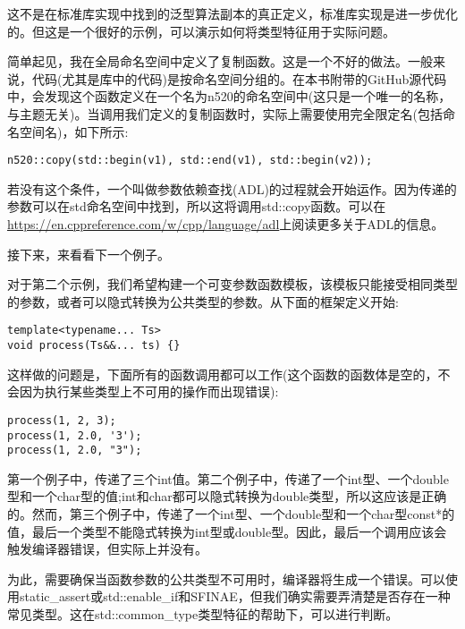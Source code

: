 这不是在标准库实现中找到的泛型算法副本的真正定义，标准库实现是进一步优化的。但这是一个很好的示例，可以演示如何将类型特征用于实际问题。

简单起见，我在全局命名空间中定义了复制函数。这是一个不好的做法。一般来说，代码(尤其是库中的代码)是按命名空间分组的。在本书附带的GitHub源代码中，会发现这个函数定义在一个名为n520的命名空间中(这只是一个唯一的名称，与主题无关)。当调用我们定义的复制函数时，实际上需要使用完全限定名(包括命名空间名)，如下所示:

\begin{lstlisting}[style=styleCXX]
n520::copy(std::begin(v1), std::end(v1), std::begin(v2));
\end{lstlisting}

若没有这个条件，一个叫做参数依赖查找(ADL)的过程就会开始运作。因为传递的参数可以在std命名空间中找到，所以这将调用std::copy函数。可以在\url{https://en.cppreference.com/w/cpp/language/adl}上阅读更多关于ADL的信息。

接下来，来看看下一个例子。


对于第二个示例，我们希望构建一个可变参数函数模板，该模板只能接受相同类型的参数，或者可以隐式转换为公共类型的参数。从下面的框架定义开始:

\begin{lstlisting}[style=styleCXX]
template<typename... Ts>
void process(Ts&&... ts) {}
\end{lstlisting}

这样做的问题是，下面所有的函数调用都可以工作(这个函数的函数体是空的，不会因为执行某些类型上不可用的操作而出现错误):

\begin{lstlisting}[style=styleCXX]
process(1, 2, 3);
process(1, 2.0, '3');
process(1, 2.0, "3");
\end{lstlisting}

第一个例子中，传递了三个int值。第二个例子中，传递了一个int型、一个double型和一个char型的值;int和char都可以隐式转换为double类型，所以这应该是正确的。然而，第三个例子中，传递了一个int型、一个double型和一个char型const*的值，最后一个类型不能隐式转换为int型或double型。因此，最后一个调用应该会触发编译器错误，但实际上并没有。

为此，需要确保当函数参数的公共类型不可用时，编译器将生成一个错误。可以使用static\_assert或std::enable\_if和SFINAE，但我们确实需要弄清楚是否存在一种常见类型。这在std::common\_type类型特征的帮助下，可以进行判断。

